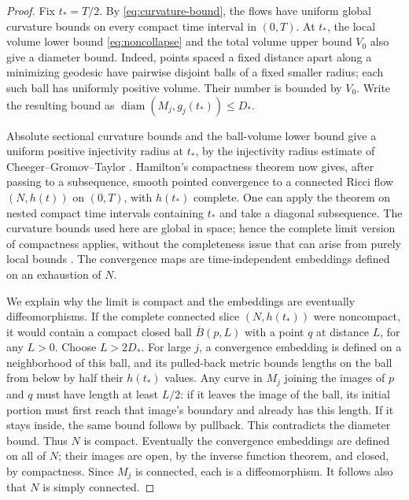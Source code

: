\documentclass[11pt]{article}
\theoremstyle{definition}
\theoremstyle{remark}
\numberwithin{equation}{section}
\DeclareMathOperator{\diam}{diam}
\begin{document}
\begin{proof}
Fix $t_*=T/2$. By \eqref{eq:curvature-bound}, the flows have uniform
global curvature bounds on every compact time interval in $(0,T)$.
At $t_*$, the local volume lower bound \eqref{eq:noncollapse} and the
total volume upper bound $V_0$ also give a diameter bound. Indeed, points
spaced a fixed distance apart along a minimizing geodesic have pairwise
disjoint balls of a fixed smaller radius; each such ball has uniformly
positive volume. Their number is bounded by $V_0$. Write the resulting
bound as $\diam(M_j,g_j(t_*))\le D_*$.

Absolute sectional curvature bounds and the ball-volume lower bound
give a uniform positive injectivity radius at $t_*$, by the injectivity
radius estimate of Cheeger--Gromov--Taylor
\cite[Theorem~4.7]{CheegerGromovTaylor}. Hamilton's compactness theorem
\cite{HamiltonCompactness} now gives, after passing to a subsequence,
smooth pointed convergence to a connected Ricci flow $(N,h(t))$ on
$(0,T)$, with $h(t_*)$ complete. One can apply the theorem on nested
compact time intervals containing $t_*$ and take a diagonal subsequence.
The curvature bounds used here are global in space; hence the complete
limit version of compactness applies, without the completeness issue
that can arise from purely local bounds
\cite[Theorem~1.1 and subsequent discussion]{ToppingCompactness}.
The convergence maps are time-independent embeddings defined on an
exhaustion of $N$.

We explain why the limit is compact and the embeddings are eventually
diffeomorphisms. If the complete connected slice $(N,h(t_*))$ were
noncompact, it would contain a compact closed ball $\overline B(p,L)$
with a point $q$ at distance $L$, for any $L>0$. Choose $L>2D_*$.
For large $j$, a convergence embedding is defined on a neighborhood of
this ball, and its pulled-back metric bounds lengths on the ball from
below by half their $h(t_*)$ values. Any curve in $M_j$ joining the
images of $p$ and $q$ must have length at least $L/2$: if it leaves the
image of the ball, its initial portion must first reach that image's
boundary and already has this length. If it stays inside, the same
bound follows by pullback. This contradicts the diameter bound.
Thus $N$ is compact. Eventually the convergence embeddings are defined
on all of $N$; their images are open, by the inverse function theorem,
and closed, by compactness. Since $M_j$ is connected, each is a
diffeomorphism. It follows also that $N$ is simply connected.


\end{proof}
\end{document}
